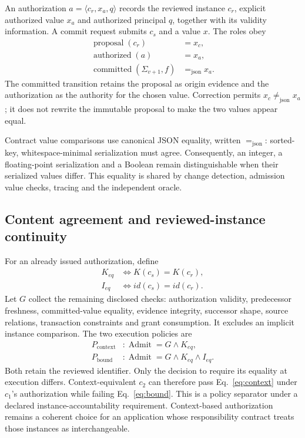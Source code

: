 \documentclass[10pt,a4paper,twocolumn]{article}
\newcommand{\jeq}{\mathrel{=_{\mathrm{json}}}}
\newcommand{\jneq}{\mathrel{\neq_{\mathrm{json}}}}
\newcommand{\context}{\mathrm{context}}
\newcommand{\bound}{\mathrm{bound}}
\begin{document}
An authorization $a=\langle c_r,x_a,q\rangle$ records the reviewed instance $c_r$, explicit authorized value $x_a$ and authorized principal $q$, together with its validity information. A commit request submits $c_s$ and a value $x$. The roles obey
\begin{align}
\operatorname{proposal}(c_r)&=x_c,\nonumber\\
\operatorname{authorized}(a)&=x_a,\nonumber\\
\operatorname{committed}(\Sigma_{v+1},f)&\jeq x_a.
\end{align}
The committed transition retains the proposal as origin evidence and the authorization as the authority for the chosen value. Correction permits $x_c\jneq x_a$; it does not rewrite the immutable proposal to make the two values appear equal.

Contract value comparisons use canonical JSON equality, written $\jeq$: sorted-key, whitespace-minimal serialization must agree. Consequently, an integer, a floating-point serialization and a Boolean remain distinguishable when their serialized values differ. This equality is shared by change detection, admission value checks, tracing and the independent oracle.

\subsection{Content agreement and reviewed-instance continuity}
For an already issued authorization, define
\begin{align}
K_{eq}&\iff K(c_s)=K(c_r),\nonumber\\
I_{eq}&\iff id(c_s)=id(c_r).
\end{align}
Let $G$ collect the remaining disclosed checks: authorization validity, predecessor freshness, committed-value equality, evidence integrity, successor shape, source relations, transaction constraints and grant consumption. It excludes an implicit instance comparison. The two execution policies are
\begin{align}
P_\context&: \operatorname{Admit}=G\land K_{eq},\label{eq:context}\\
P_\bound&: \operatorname{Admit}=G\land K_{eq}\land I_{eq}.\label{eq:bound}
\end{align}
Both retain the reviewed identifier. Only the decision to require its equality at execution differs. Context-equivalent $c_2$ can therefore pass Eq.~\ref{eq:context} under $c_1$'s authorization while failing Eq.~\ref{eq:bound}. This is a policy separator under a declared instance-accountability requirement. Context-based authorization remains a coherent choice for an application whose responsibility contract treats those instances as interchangeable.
\end{document}
